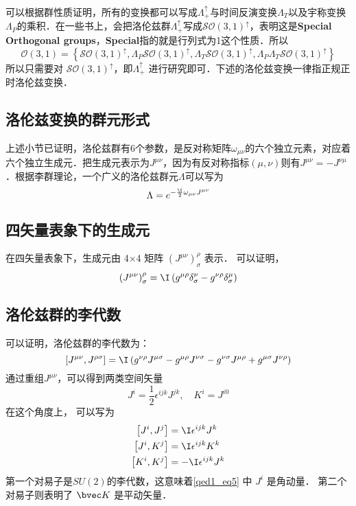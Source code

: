 可以根据群性质证明，所有的变换都可以写成$\Lambda_{+}^{\uparrow}$与时间反演变换$ \Lambda_{T}$以及宇称变换$\Lambda_{P}$的乘积．在一些书上，会把洛伦兹群$\Lambda_{+}^{\uparrow}$写成$\mathcal{S O}(3,1)^{\uparrow}$，表明这是\textbf{Special Orthogonal groups}，\textbf{Special}指的就是行列式为1这个性质．所以$$\mathcal{O}(3,1)=\left\{\mathcal{S O}(3,1)^{\uparrow}, \Lambda_{P} \mathcal{S O}(3,1)^{\uparrow}, \Lambda_{T} \mathcal{S O}(3,1)^{\uparrow}, \Lambda_{P} \Lambda_{T} \mathcal{S O}(3,1)^{\uparrow}\right\}$$所以只需要对 $\mathcal{S O}(3,1)^{\uparrow}$，即$\Lambda_{+}^{\uparrow}$ 进行研究即可．下述的洛伦兹变换一律指正规正时洛伦兹变换．

\subsection{洛伦兹变换的群元形式}
上述小节已证明，洛伦兹群有6个参数，是反对称矩阵$\omega_{\mu\nu}$的六个独立元素，对应着六个独立生成元．把生成元表示为$J^{\mu\nu}$，因为有反对称指标$(\mu,\nu)$则有$J^{\mu\nu}=-J^{\nu\mu}$．根据李群理论，一个广义的洛伦兹群元$\Lambda$可以写为
\begin{equation}
\Lambda=e^{-\frac{\I}{2} \omega_{\mu\nu}J^{\mu\nu}}
\end{equation}

\subsection{四矢量表象下的生成元}
在四矢量表象下，生成元由 4×4 矩阵 $(J^{\mu\nu})_\sigma^\rho$ 表示．
可以证明，
\begin{equation}\left(J^{\mu \nu}\right)_{\sigma}^{\rho}=\I\left(g^{\mu \rho} \delta_{\sigma}^{\nu}-g^{\nu \rho} \delta_{\sigma}^{\mu}\right)\end{equation}
\subsection{洛伦兹群的李代数}
可以证明，洛伦兹群的李代数为：
\begin{equation}\left[J^{\mu \nu}, J^{\rho \sigma}\right]=\I\left(g^{\nu \rho} J^{\mu \sigma}-g^{\mu \rho} J^{\nu \sigma}-g^{\nu \sigma} J^{\mu \rho}+g^{\mu \sigma} J^{\nu \rho}\right)\end{equation}
通过重组$J^{\mu\nu}$，可以得到两类空间矢量
\begin{equation}\label{qed1_eq5}J^{i}=\frac{1}{2} \epsilon^{i j k} J^{j k}, \quad K^{i}=J^{i 0}\end{equation}
在这个角度上， 可以写为
\begin{equation}\begin{aligned}
\left[J^{i}, J^{j}\right] &=\I \epsilon^{i j k} J^{k} \\
\left[J^{i}, K^{j}\right] &=\I \epsilon^{i j k} K^{k} \\
\left[K^{i}, K^{j}\right] &=-\I \epsilon^{i j k} J^{k}
\end{aligned}\end{equation}
第一个对易子是$SU(2)$的李代数，这意味着\autoref{qed1_eq5} 中 $J^i$ 是角动量． 第二个对易子则表明了 $\bvec K$ 是平动矢量．
